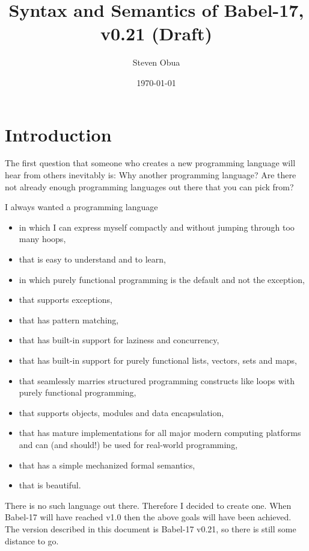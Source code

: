 \documentclass[11pt]{amsart}
\title{Syntax and Semantics of Babel-17, v0.21 (Draft)}
\author{Steven Obua}
\date{\today}
\begin{document}


\maketitle

\tableofcontents


\section{Introduction}
The first question that someone who creates a new programming language will  hear from others inevitably is: Why another programming language? Are there not already enough programming languages out there that you can pick from?

I always wanted a programming language 
\begin{itemize}
\item in which I can express myself compactly and without jumping through too many hoops, 
\item that is easy to understand and to learn,
\item in which purely functional programming is the default and not the exception,
\item that supports exceptions,
\item that has pattern matching,
\item that has built-in support for laziness and concurrency,
\item that has built-in support for purely functional lists, vectors, sets and maps,
\item that seamlessly marries structured programming constructs like loops with purely functional programming,
\item that supports objects, modules and data encapsulation,
\item that has mature implementations for all major modern computing platforms and can (and should!) be used for real-world programming,
\item that has a simple mechanized formal semantics,
\item that is beautiful.
\end{itemize}
There is no such language out there. Therefore I decided to create one. When Babel-17 will have reached v1.0 then the above goals will have been achieved. The version described in this document is Babel-17 v0.21, so there is still some distance to go. 
\end{document}

